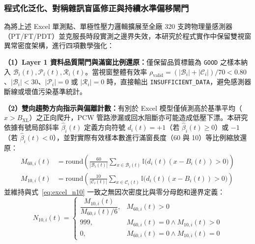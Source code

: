 \documentclass[fontset=none, a4paper, 12pt]{ctexart}
\begin{document}
\begin{doublespace}
\subsubsection{程式化泛化、對稱雜訊盲區修正與持續水準偏移閘門}
為將上述 Excel 單測點、單極性壓力邏輯擴展至全廠 320 支跨物理量感測器（PT/FT/PDT）並克服長時段實測之邊界失效，本研究於程式實作中保留雙視窗異常密度架構，進行四項數學強化：

\textbf{（1）Layer 1 資料品質閘門與滿窗比例還原：}僅保留品質標籤為 \texttt{GOOD} 之樣本納入 $\mathcal{B}_i(t), \mathcal{P}_i(t), \mathcal{R}_i(t)$。當視窗整體有效率 $\rho_{\mathrm{valid}} = (|\mathcal{B}_i|+|\mathcal{C}_i|)/70 < 0.80$、$|\mathcal{B}_i|<30$、$|\mathcal{P}_i|=0$ 或 $|\mathcal{R}_i|=0$ 時，直接輸出 \texttt{INSUFFICIENT\_DATA}，避免感測器斷線或壞值污染基準統計。

\textbf{（2）雙向趨勢方向指示與偏離計數：}有別於 Excel 模型僅偵測高於基準平均（$x > B_{\mathrm{XL}}$）之正向爬升，PCW 管路滲漏或回水阻斷亦可能造成低壓下漂。本研究依據有號局部斜率 $\hat{\beta}_i(t)$ 定義方向符號 $d_i(t) = +1$（若 $\hat{\beta}_i(t)\ge 0$）或 $-1$（若 $\hat{\beta}_i(t)<0$），並對實際有效樣本數進行滿窗長度（60 與 10）等比例縮放還原：
\begin{align}
M_{60,i}(t) &= \mathrm{round}\!\left(\frac{60}{|\mathcal{B}_i(t)|}\sum_{x\in\mathcal{B}_i(t)} \mathbb{I}\!\bigl(d_i(t)(x - B_i(t)) > 0\bigr)\right) \nonumber \\
M_{10,i}(t) &= \mathrm{round}\!\left(\frac{10}{|\mathcal{C}_i(t)|}\sum_{x\in\mathcal{C}_i(t)} \mathbb{I}\!\bigl(d_i(t)(x - B_i(t)) > 0\bigr)\right)
\label{eq:m60_m10}
\end{align}
並維持與式~\eqref{eq:excel_n10} 一致之無因次密度比與零分母飽和邊界定義：
\begin{equation}
N_{10,i}(t) = \begin{cases}
\dfrac{M_{10,i}(t)}{M_{60,i}(t)/6}, & M_{60,i}(t) > 0 \\[8pt]
999, & M_{60,i}(t)=0 \land M_{10,i}(t)>0 \\
0, & M_{60,i}(t)=0 \land M_{10,i}(t)=0
\end{cases}
\label{eq:n10}
\end{equation}


\end{doublespace}
\end{document}
